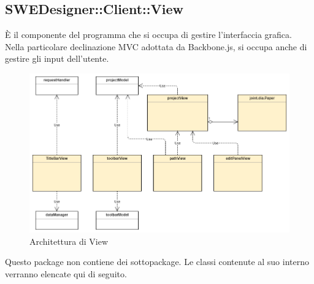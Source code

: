 \documentclass[../DefinizioneDiProdotto.tex]{subfiles}
\begin{document}
			\subsection{SWEDesigner::Client::View}
				\hypertarget{SWEDesigner::Client::View}{}
				È il componente del programma che si occupa di gestire l'interfaccia grafica. Nella particolare declinazione MVC adottata da Backbone.js, si occupa anche di gestire gli input dell'utente.
					\begin{figure}[H]\label{fig:View}
						\centering
						\includegraphics[scale=0.44]{Immagini/DiagrammaArchitettura/View.png}
						\caption{Architettura di View}
					\end{figure}
				Questo package non contiene dei sottopackage.
				Le classi contenute al suo interno verranno elencate qui di seguito.
\end{document}

